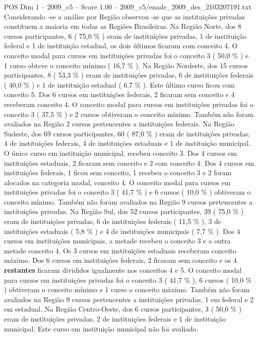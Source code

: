 \begin{textsample}{POS Dim 1 – 2009\_c5 – Score 1.00 – 2009\_c5/enade\_2009\_des\_2103207191.txt}
Considerando -se a análise por Região observou -se que as instituições privadas constituem a maioria em todas as Regiões Brasileiras.
Na Região Norte, dos 8 cursos participantes, 6 ( 75,0 \% ) eram de instituições privadas, 1 de instituição federal e 1 de instituição estadual, os dois últimos ficaram com conceito 4.
O conceito modal para cursos em instituições privadas foi o conceito 3 ( 50,0 \% ) e 1 curso obteve o conceito mínimo ( 16,7 \% ).
Na Região Nordeste, dos 15 cursos participantes, 8 ( 53,3 \% ) eram de instituições privadas, 6 de instituições federais ( 40,0 \% ) e 1 de instituição estadual ( 6,7 \% ).
Este último curso ficou com conceito 5.
Dos 6 cursos em instituições federais, 2 ficaram sem conceito e 4 receberam conceito 4.
O conceito modal para cursos em instituições privadas foi o conceito 3 ( 37,5 \% ) e 2 cursos obtiveram o conceito mínimo.
Também não foram avaliados na Região 2 cursos pertencentes a instituições federais.
Na Região Sudeste, dos 69 cursos participantes, 60 ( 87,0 \% ) eram de instituições privadas, 4 de instituições federais, 4 de instituições estaduais e 1 de instituição municipal.
O único curso em instituição municipal, recebeu conceito 3.
Dos 4 cursos em instituições estaduais, 2 ficaram sem conceito e 2 com conceito 4.
Dos 4 cursos em instituições federais, 1 ficou sem conceito, 1 recebeu o conceito 3 e 2 foram alocados na categoria modal, conceito 4.
O conceito modal para cursos em instituições privadas foi o conceito 3 ( 41,7 \% ) e 6 cursos ( 10,0 \% ) obtiveram o conceito mínimo.
Também não foram avaliados na Região 9 cursos pertencentes a instituições privadas.
Na Região Sul, dos 52 cursos participantes, 39 ( 75,0 \% ) eram de instituições privadas, 6 de instituições federais ( 11,5 \% ), 3 de instituições estaduais ( 5,8 \% ) e 4 de instituições municipais ( 7,7 \% ).
Dos 4 cursos em instituições municipais, a metade recebeu o conceito 3 e a outra metade conceito 4.
Os 3 cursos em instituições estaduais receberam conceito máximo.
Dos 6 cursos em instituições federais, 2 ficaram sem conceito e os 4 \textbf{restantes} ficaram divididos igualmente nos conceitos 4 e 5.
O conceito modal para cursos em instituições privadas foi o conceito 3 ( 41,7 \% ), 6 cursos ( 10,0 \% ) obtiveram o conceito mínimo e 1 curso o conceito máximo.
Também não foram avaliados na Região 9 cursos pertencentes a instituições privadas, 1 em federal e 2 em estadual.
Na Região Centro-Oeste, dos 6 cursos participantes, 3 ( 50,0 \% ) eram de instituições privadas, 2 de instituições federais e 1 de instituição municipal.
Este curso em instituição municipal não foi avaliado.

\end{textsample}
